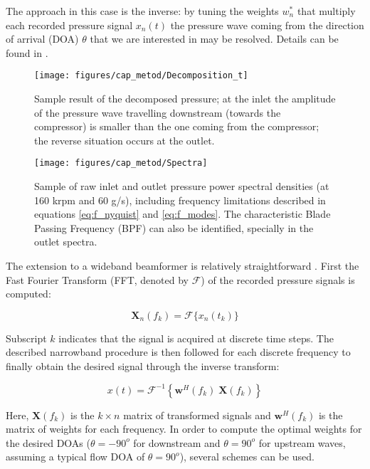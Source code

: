 The approach in this case is the inverse: by tuning the weights $w_n^*$ that multiply each recorded pressure signal $x_n(t)$ the pressure wave coming from the direction of arrival (DOA) $\theta$ that we are interested in may be resolved. Details can be found in \cite{van1988beamforming}.

\begin{figure}[t!]
\centering
\texttt{[image: figures/cap\_metod/Decomposition\_t]}
\caption[Sample result of decomposed pressure]{Sample result of the decomposed pressure; at the inlet the amplitude of the pressure wave travelling downstream (towards the compressor) is smaller than the one coming from the compressor; the reverse situation occurs at the outlet.}
\label{fig:decomposition}
\end{figure}

\begin{figure}[t!]
\texttt{[image: figures/cap\_metod/Spectra]}
\caption[Sample of raw inlet and outlet pressure PSD]{Sample of raw inlet and outlet pressure power spectral densities (at 160 krpm and 60 g/s), including frequency limitations described in equations \ref{eq:f_nyquist} and \ref{eq:f_modes}. The characteristic Blade Passing Frequency (BPF) can also be identified, specially in the outlet spectra.}
\label{fig:spectra}
\end{figure}

The extension to a wideband beamformer is relatively straightforward \cite{piper2011broadband}. First the Fast Fourier Transform (FFT, denoted by $\mathcal F$) of the recorded pressure signals is computed:

\begin{equation}
  \mathbf X_n(f_k)=\mathcal{F}\{x_n(t_k)\}
\end{equation}

Subscript $k$ indicates that the signal is acquired at discrete time steps. The described narrowband procedure is then followed for each discrete frequency to finally obtain the desired signal through the inverse transform:

\begin{equation}
    x(t)=\mathcal{F}^{-1}\left\{\mathbf w^H(f_k)\; \mathbf X(f_k)\right\}
\end{equation}

Here, $\mathbf X(f_k)$ is the $k \times n$ matrix of transformed signals and $\mathbf w^H(f_k)$ is the matrix of weights for each frequency. In order to compute the optimal weights for the desired DOAs ($\theta=-90^o$ for downstream and $\theta=90^o$ for upstream waves, assuming a typical flow DOA of $\theta=90^o$), several schemes can be used.


